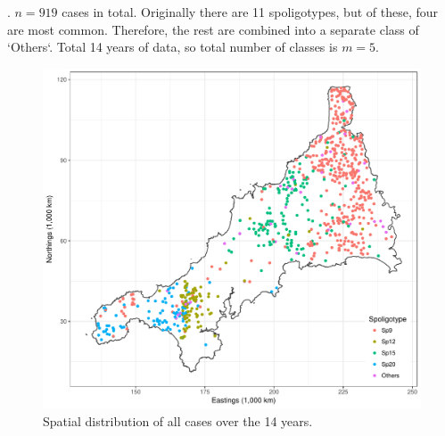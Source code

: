 \documentclass[a4paper,showframe,11pt]{report}\usepackage[]{graphicx}\usepackage[]{color}
\newenvironment{knitrout}{}{} %
\begin{document}
. $n=919$ cases in total. Originally there are 11 spoligotypes, but of these, four are most common. Therefore, the rest are combined into a separate class of `Others`. Total 14 years of data, so total number of classes is $m = 5$.

\begin{knitrout}
\color{fgcolor}\begin{figure}[h]

{\centering \includegraphics[width=\linewidth]{figure/plot_cornwall-1} 

}

\caption[Spatial distribution of all cases over the 14 years]{Spatial distribution of all cases over the 14 years.}\label{fig:plot.cornwall}
\end{figure}


\end{knitrout}
\end{document}
